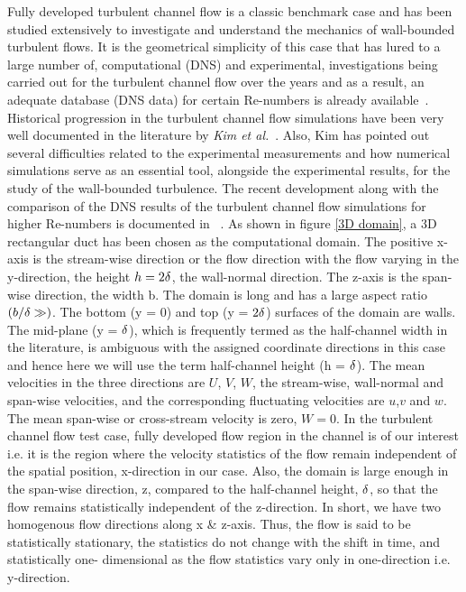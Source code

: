 Fully developed turbulent channel flow is a classic benchmark case and has been studied extensively to investigate and understand the mechanics of wall-bounded turbulent flows. It is the geometrical simplicity of this case that has lured to a large number of, computational (DNS) and experimental, investigations being carried out for the turbulent channel flow over the years and as a result, an adequate database (DNS data) for certain Re-numbers is already available~\cite{channeldata:99}. Historical progression in the turbulent channel flow simulations have been very well documented in the literature by \emph{Kim et al.}~\cite{kim:moin:moser:87}. Also, Kim has pointed out several difficulties related to the experimental measurements and how numerical simulations serve as an essential tool, alongside the experimental results, for the study of the wall-bounded turbulence. The recent development along with the comparison of the DNS results of the turbulent channel flow simulations for higher Re-numbers is documented in ~\cite{lee:moser:15}.
As shown in figure \ref{3D domain}, a 3D rectangular duct has been chosen as the computational domain. The positive x-axis is the stream-wise direction or the flow direction with the flow varying in the y-direction, the height $h = 2\delta$, the wall-normal direction. The z-axis is the span-wise direction, the width b. The domain is long and has a large aspect ratio $\left(b/\delta \gg \right)$. The bottom (y = 0) and top (y = $2\delta$) surfaces of the domain are walls. The mid-plane (y = $\delta$), which is frequently termed as the half-channel width in the literature, is ambiguous with the assigned coordinate directions in this case and hence here we will use the term half-channel height (h = $\delta$). 
The mean velocities in the three directions are $U$, $V$, $W$, the stream-wise, wall-normal and span-wise velocities, and the corresponding fluctuating velocities are $u$,$v$ and $w$. The mean span-wise or cross-stream velocity is zero, $W = 0$. 
In the turbulent channel flow test case, fully developed flow region in the channel is of our interest i.e. it is the region where the velocity statistics of the flow remain independent of the spatial position, x-direction in our case. Also, the domain is large enough in the span-wise direction, z, compared to the half-channel height, $\delta$, so that the flow remains statistically independent of the z-direction. In short, we have two homogenous flow directions along x \& z-axis. Thus, the flow is said to be statistically stationary, the statistics do not change with the shift in time, and statistically one- dimensional as the flow statistics vary only in one-direction i.e. y-direction. 
